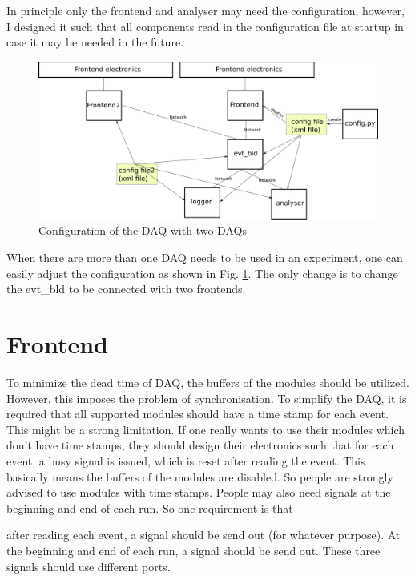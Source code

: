 \documentclass[a4paper,12pt]{article}
\begin{document}
	 In principle only the frontend and analyser may need the configuration,
	 however, I designed it such that all components read in the
	 configuration file at startup in case it may be needed in the future.
	\begin{figure}
		\begin{center}
			\includegraphics[width=.7\textwidth]{figs/daq_scheme2.eps}
			\caption{\label{fig02}Configuration of the DAQ with two DAQs}
		\end{center}
	\end{figure}
	When there are more than one DAQ needs to be used in an experiment, one
	can easily adjust the configuration as shown in Fig. \ref{fig02}. The
	only change is to change the evt\_bld to be connected with two frontends.

	\section{Frontend}
	To minimize the dead time of DAQ, the buffers of the modules should be
	utilized. However, this imposes the problem of synchronisation. To
	simplify the DAQ, it is required that all supported modules should have
	a time stamp for each event. This might be a strong limitation. If one
	really wants to use their modules which don't have time stamps, they
	should design their electronics such that for each event, a busy signal
	is issued, which is reset after reading the event. This basically means
	the buffers of the modules are disabled. So people are strongly advised
	to use modules with time stamps.  
	People may also need signals at the beginning and end of each run. 
	So one requirement is that 
	 \begin{tcolorbox}
	 after reading each event, a signal should be send out (for whatever purpose).
     At the beginning and end of each run, a signal should be send out. These
	 three signals should use different ports.
	 \end{tcolorbox}
\end{document}
